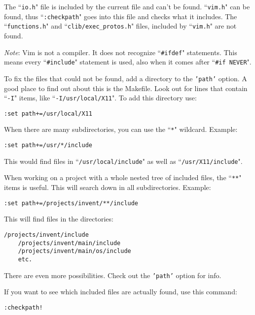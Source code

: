 The ``\texttt{io.h}" file is included by the current file and can't be found.
``\texttt{vim.h}" can be found, thus ``\texttt{:checkpath}" goes into this file and checks what it includes.
The ``\texttt{functions.h}" and ``\texttt{clib/exec\_protos.h}" files, included by ``\texttt{vim.h}" are not found.

\emph{Note}:
Vim is not a compiler.
It does not recognize ``\texttt{\#ifdef}" statements.
This means every ``\texttt{\#include}" statement is used, also when it comes after ``\texttt{\#if NEVER}".

To fix the files that could not be found, add a directory to the \texttt{'path'} option.
A good place to find out about this is the Makefile.
Look out for lines that contain ``\texttt{-I}" items, like ``\texttt{-I/usr/local/X11}".
To add this directory use:

\begin{Verbatim}[samepage=true]
 :set path+=/usr/local/X11
\end{Verbatim}

When there are many subdirectories, you can use the ``\texttt{*}" wildcard.
Example:

\begin{Verbatim}[samepage=true]
 :set path+=/usr/*/include
\end{Verbatim}

This would find files in ``\texttt{/usr/local/include}" as well as ``\texttt{/usr/X11/include}".

When working on a project with a whole nested tree of included files, the ``\texttt{**}" items is useful.
This will search down in all subdirectories.
Example:

\begin{Verbatim}[samepage=true]
 :set path+=/projects/invent/**/include
\end{Verbatim}

This will find files in the directories:

\begin{Verbatim}[samepage=true]
    /projects/invent/include 
    /projects/invent/main/include 
    /projects/invent/main/os/include 
    etc.
\end{Verbatim}

There are even more possibilities.
Check out the \texttt{'path'} option for info.

If you want to see which included files are actually found, use this command:

\begin{Verbatim}[samepage=true]
 :checkpath!
\end{Verbatim}

